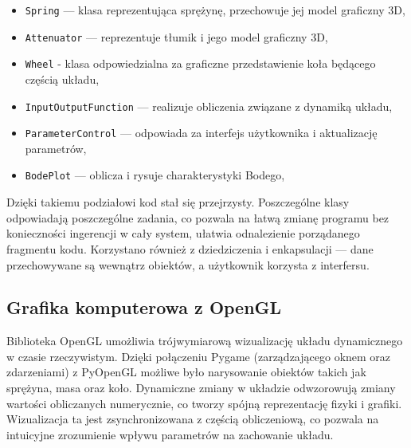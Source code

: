 \documentclass[10pt, a4paper]{article}
\begin{document}
\begin{itemize}
  \item \texttt{Spring} — klasa reprezentująca sprężynę, przechowuje jej model graficzny 3D,
  \item \texttt{Attenuator} — reprezentuje tłumik i jego model graficzny 3D,
  \item \texttt{Wheel} - klasa odpowiedzialna za graficzne przedstawienie koła będącego częścią układu,
  \item \texttt{InputOutputFunction} — realizuje obliczenia związane z dynamiką układu,
  \item \texttt{ParameterControl} — odpowiada za interfejs użytkownika i aktualizację parametrów,
  \item \texttt{BodePlot} — oblicza i rysuje charakterystyki Bodego,
\end{itemize}

Dzięki takiemu podziałowi kod stał się przejrzysty. Poszczególne klasy odpowiadają poszczególne zadania, co pozwala na łatwą zmianę programu bez konieczności ingerencji w cały system, ułatwia odnalezienie porządanego fragmentu kodu. Korzystano również z dziedziczenia i enkapsulacji — dane przechowywane są wewnątrz obiektów, a użytkownik korzysta z interfersu.

\vspace{0.5cm}

\subsection*{Grafika komputerowa z OpenGL}

Biblioteka OpenGL umożliwia trójwymiarową wizualizację układu dynamicznego w czasie rzeczywistym. Dzięki połączeniu Pygame (zarządzającego oknem oraz zdarzeniami) z PyOpenGL możliwe było narysowanie obiektów takich jak sprężyna, masa oraz koło. Dynamiczne zmiany w układzie odwzorowują zmiany wartości obliczanych numerycznie, co tworzy spójną reprezentację fizyki i grafiki.
Wizualizacja ta jest zsynchronizowana z częścią obliczeniową, co pozwala na intuicyjne zrozumienie wpływu parametrów na zachowanie układu.
\end{document}
